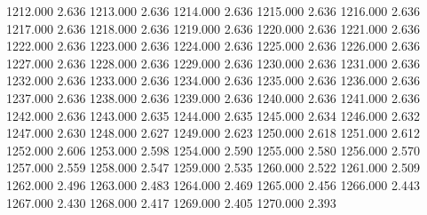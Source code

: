 1212.000 2.636 
1213.000 2.636 
1214.000 2.636 
1215.000 2.636 
1216.000 2.636 
1217.000 2.636 
1218.000 2.636 
1219.000 2.636 
1220.000 2.636 
1221.000 2.636 
1222.000 2.636 
1223.000 2.636 
1224.000 2.636 
1225.000 2.636 
1226.000 2.636 
1227.000 2.636 
1228.000 2.636 
1229.000 2.636 
1230.000 2.636 
1231.000 2.636 
1232.000 2.636 
1233.000 2.636 
1234.000 2.636 
1235.000 2.636 
1236.000 2.636 
1237.000 2.636 
1238.000 2.636 
1239.000 2.636 
1240.000 2.636 
1241.000 2.636 
1242.000 2.636 
1243.000 2.635 
1244.000 2.635 
1245.000 2.634 
1246.000 2.632 
1247.000 2.630 
1248.000 2.627 
1249.000 2.623 
1250.000 2.618 
1251.000 2.612 
1252.000 2.606 
1253.000 2.598 
1254.000 2.590 
1255.000 2.580 
1256.000 2.570 
1257.000 2.559 
1258.000 2.547 
1259.000 2.535 
1260.000 2.522 
1261.000 2.509 
1262.000 2.496 
1263.000 2.483 
1264.000 2.469 
1265.000 2.456 
1266.000 2.443 
1267.000 2.430 
1268.000 2.417 
1269.000 2.405 
1270.000 2.393 

